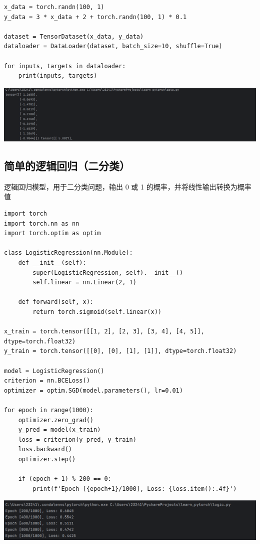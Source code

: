 \documentclass[UTF8,a4paper]{ctexart}
\begin{document}
\begin{sloppypar}
\begin{lstlisting}
x_data = torch.randn(100, 1)
y_data = 3 * x_data + 2 + torch.randn(100, 1) * 0.1

dataset = TensorDataset(x_data, y_data)
dataloader = DataLoader(dataset, batch_size=10, shuffle=True)

for inputs, targets in dataloader:
    print(inputs, targets)
    \end{lstlisting}
	
	\includegraphics[width = 16cm]{16}
	
	\subsection{简单的逻辑回归（二分类）}
	逻辑回归模型，用于二分类问题，输出 0 或 1 的概率，并将线性输出转换为概率值
	\begin{lstlisting}
import torch
import torch.nn as nn
import torch.optim as optim

class LogisticRegression(nn.Module):
    def __init__(self):
        super(LogisticRegression, self).__init__()
        self.linear = nn.Linear(2, 1)

    def forward(self, x):
        return torch.sigmoid(self.linear(x))

x_train = torch.tensor([[1, 2], [2, 3], [3, 4], [4, 5]], dtype=torch.float32)
y_train = torch.tensor([[0], [0], [1], [1]], dtype=torch.float32)

model = LogisticRegression()
criterion = nn.BCELoss()
optimizer = optim.SGD(model.parameters(), lr=0.01)

for epoch in range(1000):
    optimizer.zero_grad()
    y_pred = model(x_train)
    loss = criterion(y_pred, y_train)
    loss.backward()
    optimizer.step()

    if (epoch + 1) % 200 == 0:
        print(f'Epoch [{epoch+1}/1000], Loss: {loss.item():.4f}')
    \end{lstlisting}
	
	\includegraphics[width = 16cm]{17}
	

\end{sloppypar}
\end{document}
